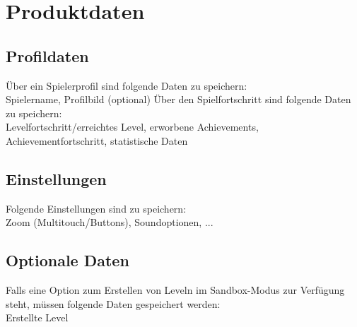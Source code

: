 \section{Produktdaten}

\subsection{Profildaten}
\begin{requirements}
	 Über ein Spielerprofil sind folgende Daten zu speichern:\\
	Spielername, Profilbild (optional)
	 Über den Spielfortschritt sind folgende Daten zu speichern:\\
	Levelfortschritt/erreichtes Level, erworbene Achievements, Achievementfortschritt, statistische Daten
\end{requirements}

\subsection{Einstellungen}
\begin{requirements}
	 Folgende Einstellungen sind zu speichern:\\
	Zoom (Multitouch/Buttons), Soundoptionen, ...
\end{requirements}

\subsection{Optionale Daten}
\begin{requirements}
	 Falls eine Option zum Erstellen von Leveln im Sandbox-Modus zur Verfügung steht, 		müssen folgende Daten gespeichert werden:\\
	Erstellte Level
\end{requirements}
	
